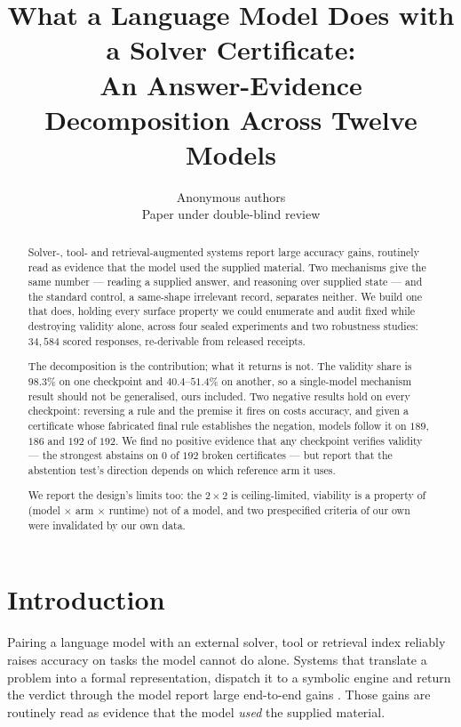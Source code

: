 \documentclass[10pt,twocolumn]{article}
\title{What a Language Model Does with a Solver Certificate:\\
An Answer-Evidence Decomposition Across Twelve Models}
\author{Anonymous authors\\Paper under double-blind review}
\date{}
\begin{document}
\maketitle

\begin{abstract}
Solver-, tool- and retrieval-augmented systems report large accuracy gains,
routinely read as evidence that the model used the supplied material. Two
mechanisms give the same number --- reading a supplied answer, and reasoning over
supplied state --- and the standard control, a same-shape irrelevant record,
separates neither. We build one that does, holding every surface property we could enumerate
and audit fixed
while destroying validity alone, across four sealed experiments and two
robustness studies: $34{,}584$ scored responses, re-derivable from
released receipts.

The decomposition is the contribution; what it returns is not. The validity
share is $98.3\%$ on one checkpoint and $40.4$--$51.4\%$ on another, so a
single-model mechanism result should not be generalised, ours included. Two
negative results hold on every checkpoint: reversing a rule and the premise it
fires on costs accuracy, and given a certificate whose fabricated final rule
establishes the negation, models follow it on $189$, $186$ and $192$ of $192$. We
find no positive evidence that any checkpoint verifies validity --- the strongest
abstains on $0$ of $192$ broken certificates --- but report that the abstention
test's direction depends on which reference arm it uses.

We report the design's limits too: the $2\times2$ is ceiling-limited, viability
is a property of (model $\times$ arm $\times$ runtime) not of a model, and two
prespecified criteria of our own were invalidated by our own data.
\end{abstract}

\section{Introduction}

Pairing a language model with an external solver, tool or retrieval index
reliably raises accuracy on tasks the model cannot do alone. Systems that translate a problem into a formal representation, dispatch it to a
symbolic engine and return the verdict through the model report large end-to-end
gains \citep{pan2023logiclm,olausson2023linc,ye2023satlm,gao2022pal,schick2023toolformer,yang2023leandojo,lewis2020retrievalaugmented}.
Those gains are routinely read as evidence that the model \emph{used} the
supplied material.
\end{document}
